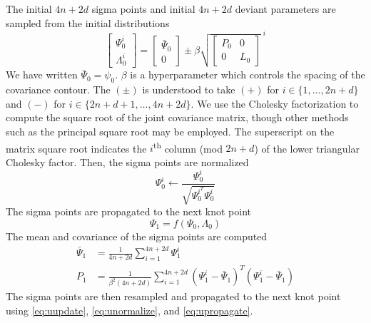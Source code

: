 The initial $4n + 2d$ sigma points and initial $4n + 2d$ deviant parameters are sampled
from the initial distributions
\begin{equation}\label{eq:uupdate}
  \begin{bmatrix} \Psi_{0}^{i} \\ \Lambda_{0}^{i} \end{bmatrix} =
  \begin{bmatrix} \bar{\Psi}_{0} \\ 0\end{bmatrix}
    \pm \beta \sqrt{\begin{bmatrix} P_{0} & 0\\ 0 & L_{0}\end{bmatrix}}^{\; i}
\end{equation}
We have written $\bar{\Psi}_{0} = \psi_{0}$. $\beta$
is a hyperparameter which controls the spacing of the covariance contour.
The $(\pm)$ is understood to take $(+)$ for $ i \in \{1, \dots, 2n + d\}$ and $(-)$ for
$i \in \{2n + d + 1, \dots, 4n + 2d\}$. We use the Cholesky factorization
to compute the square root of the
joint covariance matrix, though other methods
such as the principal square root may be employed.
The superscript on the matrix square root indicates the $i$\textsuperscript{th}
column (mod $2n + d$) of the lower triangular Cholesky factor.
Then, the sigma points are normalized
\begin{equation}\label{eq:unormalize}
  \Psi_{0}^{i} \gets \frac{\Psi_{0}^{i}}{\sqrt{\Psi_{0}^{i^{T}} \Psi_{0}^{i}}}
\end{equation}
The sigma points are propagated to the next knot point
\begin{equation}\label{eq:upropagate}
  \Psi_{1} = f(\Psi_{0}, \Lambda_{0})
\end{equation}
The mean and covariance of the sigma points are computed
\begin{align}
  \bar{\Psi}_{1} &= \frac{1}{4n + 2d} \sum_{i = 1}^{4n + 2d} \Psi_{1}^{i}\\
  P_{1} &= \frac{1}{\beta^{2}(4n + 2d)} \sum_{i = 1}^{4n + 2d}
  (\Psi^{i}_{1} - \bar{\Psi}_{1})^{T}(\Psi^{i}_{1} - \bar{\Psi}_{1})
\end{align}
The sigma points are then resampled and propagated to the next knot point using
\eqref{eq:uupdate}, \eqref{eq:unormalize}, and \eqref{eq:upropagate}.





